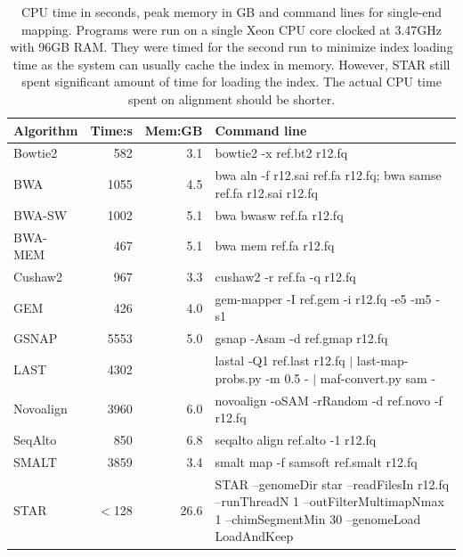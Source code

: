 \documentclass[10pt,pdftex]{article}
\begin{document}
\begin{table}[!tbhp]
\footnotesize
\centering
\begin{tabular}{lrrp{9cm}}
\hline
Algorithm & Time:s & Mem:GB & Command line \\
\hline
Bowtie2   & 582 & 3.1 & bowtie2 -x ref.bt2 r12.fq \\
BWA       & 1055& 4.5 & bwa aln -f r12.sai ref.fa r12.fq; bwa samse ref.fa r12.sai r12.fq \\
BWA-SW    & 1002& 5.1 & bwa bwasw ref.fa r12.fq \\
BWA-MEM   & 467 & 5.1 & bwa mem ref.fa r12.fq \\
Cushaw2   & 967 & 3.3 & cushaw2 -r ref.fa -q r12.fq \\
GEM       & 426 & 4.0 & gem-mapper -I ref.gem -i r12.fq -e5 -m5 -s1 \\
GSNAP     & 5553& 5.0 & gsnap -Asam -d ref.gmap r12.fq \\
LAST      & 4302& & lastal -Q1 ref.last r12.fq $|$ last-map-probs.py -m 0.5 - $|$ maf-convert.py sam - \\
Novoalign & 3960& 6.0 & novoalign -oSAM -rRandom -d ref.novo -f r12.fq \\
SeqAlto   & 850 & 6.8 & seqalto align ref.alto -1 r12.fq \\
SMALT     & 3859& 3.4 & smalt map -f samsoft ref.smalt r12.fq \\
STAR      & $<$128 & 26.6& STAR --genomeDir star --readFilesIn r12.fq --runThreadN 1 --outFilterMultimapNmax 1 --chimSegmentMin 30 --genomeLoad LoadAndKeep \\
\hline
\end{tabular}
\caption{CPU time in seconds, peak memory in GB and command lines for
single-end mapping.  Programs were run on a single Xeon CPU core clocked at
3.47GHz with 96GB RAM. They were timed for the second run to minimize index
loading time as the system can usually cache the index in memory. However, STAR
still spent significant amount of time for loading the index. The actual CPU
time spent on alignment should be shorter.}
\end{table}
\end{document}

